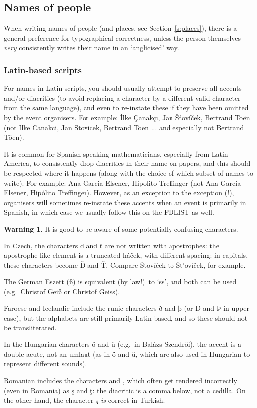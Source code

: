 \documentclass[12pt]{scrartcl}
\theoremstyle{definition}
\newtheorem*{warn}{Warning}
\begin{document}
\subsection{Names of people}
\label{s:people}
When writing names of people (and places, see Section~\ref{s:places}), there is a general preference for typographical correctness, unless the person themselves \emph{very} consistently writes their name in an `anglicised' way.

\subsubsection{Latin-based scripts}
For names in Latin scripts, you should usually attempt to preserve all accents and/or diacritics (to avoid replacing a character by a different valid character from the same language), and even to re-instate these if they have been omitted by the event organisers. For example: İlke Çanakçı, Jan Šťovíček, Bertrand Toën (not Ilke Canakci, Jan Stovicek, Bertrand Toen ... and especially not Bertrand Töen).

It is common for Spanish-speaking mathematicians, especially from Latin America, to consistently drop diacritics in their name on papers, and this should be respected where it happens (along with the choice of which subset of names to write).
For example: Ana Garcia Elsener, Hipolito Treffinger (not Ana García Elsener, Hipólito Treffinger).
However, as an exception to the exception (!), organisers will sometimes re-instate these accents when an event is primarily in Spanish, in which case we usually follow this on the FDLIST as well.

\begin{warn}
It is good to be aware of some potentially confusing characters.

In Czech, the characters ď and ť are not written with apostrophes: the apostrophe-like element is a truncated háček, with different spacing: in capitals, these characters become Ď and Ť.
Compare Šťovíček to Št'ovíček, for example.

The German Eszett (ß) is equivalent (by law!)\ to `ss', and both can be used (e.g.\ Christof Geiß or Christof Geiss).

Faroese and Icelandic include the runic characters ð and þ (or Ð and Þ in upper case), but the alphabets are still primarily Latin-based, and so these should not be transliterated.

In the Hungarian characters ő and ű (e.g.\ in Balázs Szendrői), the accent is a double-acute, not an umlaut (as in ö and ü, which are also used in Hungarian to represent different sounds).

Romanian includes the characters  and , which often get rendered incorrectly (even in Romania) as ş and ţ:  the diacritic is a comma below, not a cedilla.
On the other hand, the character ş \emph{is} correct in Turkish.
\end{warn}
\end{document}
